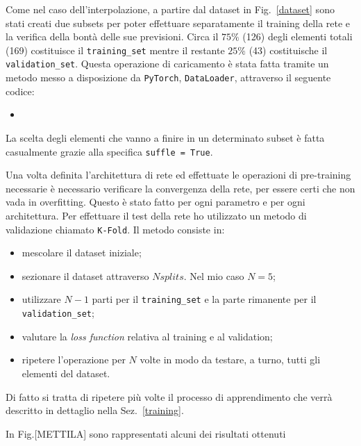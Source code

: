 \documentclass[12pt,a4paper,final]{book}
\newcommand{\insertcode}[2]{\begin{itemize}\item[]\end{itemize}} %
\begin{document}
Come nel caso dell'interpolazione, a partire dal dataset in Fig.~\ref{dataset} sono stati creati due subsets per poter effettuare separatamente il training della rete e la verifica della bontà delle sue previsioni. Circa il $75\%$ (126) degli elementi totali (169) costituisce il \texttt{training\_set} mentre il restante $25\%$ (43) costituische il \texttt{validation\_set}. Questa operazione di caricamento è stata fatta tramite un metodo messo a disposizione da \texttt{PyTorch}, \texttt{DataLoader}, attraverso il seguente codice:
\insertcode{../scripts/loader.py}{Loader}\label{loader}
La scelta degli elementi che vanno a finire in un determinato subset è fatta casualmente grazie alla specifica \texttt{suffle = True}.


Una volta definita l'architettura di rete ed effettuate le operazioni di pre-training necessarie è necessario verificare la convergenza della rete, per essere certi che non vada in overfitting. Questo è stato fatto per ogni parametro e per ogni architettura.
Per effettuare il test della rete ho utilizzato un metodo di validazione chiamato \texttt{K-Fold}. Il metodo consiste in:
\begin{itemize}
	\item mescolare il dataset iniziale;
	\item sezionare il dataset attraverso $N splits$. Nel mio caso $N=5$;
	\item utilizzare $N-1$ parti per il \texttt{training\_set} e la parte rimanente per il \texttt{validation\_set};
	\item valutare la \textit{loss function} relativa al training e al validation;
	\item ripetere l'operazione per $N$ volte in modo da testare, a turno, tutti gli elementi del dataset.
\end{itemize}
Di fatto si tratta di ripetere più volte il processo di apprendimento che verrà descritto in dettaglio nella Sez.~\ref{training}.

In Fig.[METTILA] sono rappresentati alcuni dei risultati ottenuti
\end{document}
